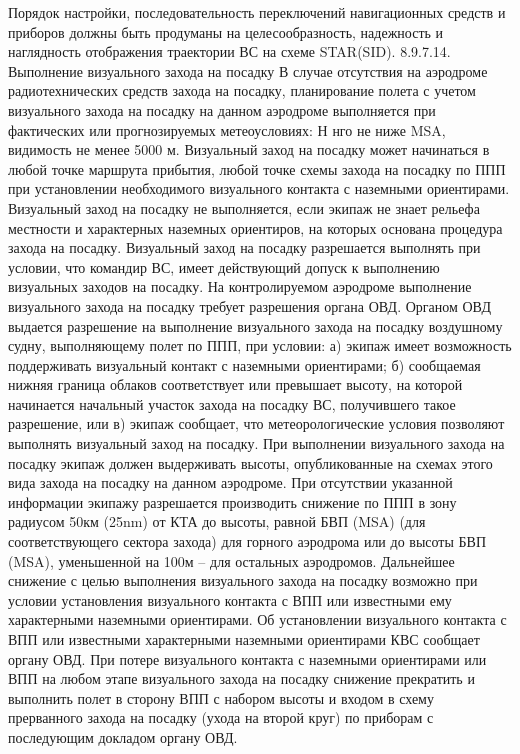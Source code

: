 Порядок настройки, последовательность переключений навигационных средств и приборов должны быть продуманы на целесообразность, надежность и наглядность отображения траектории ВС на схеме STAR(SID).
8.9.7.14.	Выполнение визуального захода на посадку
В случае отсутствия на аэродроме радиотехнических средств захода на посадку, планирование полета с учетом визуального захода на посадку на данном аэродроме выполняется при фактических или прогнозируемых метеоусловиях: Н нго не ниже MSA, видимость не менее 5000 м.
Визуальный заход на посадку может начинаться в любой точке маршрута прибытия, любой точке схемы захода на посадку по ППП при установлении необходимого визуального контакта с наземными ориентирами.
Визуальный заход на посадку не выполняется, если экипаж не знает рельефа местности и характерных наземных ориентиров, на которых основана процедура захода на посадку.
Визуальный заход на посадку разрешается выполнять при условии, что командир ВС, имеет действующий допуск к выполнению визуальных заходов на посадку.
На контролируемом аэродроме выполнение визуального захода на посадку требует разрешения органа ОВД.
Органом ОВД выдается разрешение на выполнение визуального захода на посадку воздушному судну, выполняющему полет по ППП, при условии:
а)	экипаж имеет возможность поддерживать визуальный контакт с наземными ориентирами;
б)	сообщаемая нижняя граница облаков соответствует или превышает высоту, на которой начинается начальный участок захода на посадку ВС, получившего такое разрешение, или
в)	экипаж сообщает, что метеорологические условия позволяют выполнять визуальный заход на посадку.
При выполнении визуального захода на посадку экипаж должен выдерживать высоты, опубликованные на схемах этого вида захода на посадку на данном аэродроме. При отсутствии указанной информации экипажу разрешается производить снижение по ППП в зону радиусом 50км (25nm) от КТА до высоты, равной БВП (MSA) (для соответствующего сектора захода) для горного аэродрома или до высоты БВП (MSA), уменьшенной на 100м – для остальных аэродромов. Дальнейшее снижение с целью выполнения визуального захода на посадку возможно при условии установления визуального контакта с ВПП или известными ему характерными наземными ориентирами.
Об установлении визуального контакта с ВПП или известными характерными наземными ориентирами КВС сообщает органу ОВД.
При потере визуального контакта с наземными ориентирами или ВПП на любом этапе визуального захода на посадку снижение прекратить и выполнить полет в сторону ВПП с набором высоты и входом в схему прерванного захода на посадку (ухода на второй круг) по приборам с последующим докладом органу ОВД.


